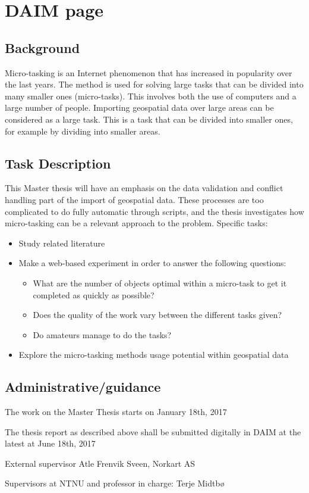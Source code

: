 \chapter*{DAIM page}

\section*{Background}
Micro-tasking is an Internet phenomenon that has increased in popularity over the last years. The method is used for solving large tasks that can be divided into many smaller ones (micro-tasks).  This involves both the use of computers and a large number of people. Importing geospatial data over large areas can be considered as a large task. This is a task that can be divided into smaller ones, for example by dividing into smaller areas.

\section*{Task Description}

This Master thesis will have an emphasis on the data validation and conflict handling part of the import of geospatial data. These processes are too complicated to do fully automatic through scripts, and the thesis investigates how micro-tasking can be a relevant approach to the problem. 
Specific tasks:
\begin{itemize}
	\item Study related literature
	\item Make a web-based experiment in order to answer the following questions:
	\begin{itemize}
		\item What are the number of objects optimal within a micro-task to get it completed as quickly as possible?
		\item Does the quality of the work vary between the different tasks given?
		\item Do amateurs manage to do the tasks?
	\end{itemize}
	\item Explore the micro-tasking methods usage potential within geospatial data
\end{itemize}

\section*{Administrative/guidance}
The work on the Master Thesis starts on January 18th, 2017

The thesis report as described above shall be submitted digitally in DAIM at the latest at June 18th, 2017

External supervisor
Atle Frenvik Sveen, Norkart AS

Supervisors at NTNU and professor in charge:
Terje Midtbø
